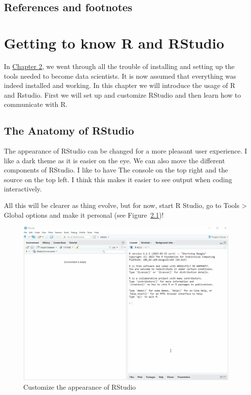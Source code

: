 \documentclass[
  11pt,
  letterpaper,
]{scrbook}
\begin{document}
\hypertarget{references-and-footnotes-1}{%
\section{References and footnotes}\label{references-and-footnotes-1}}


\hypertarget{getting-to-know-r-and-rstudio}{%
\chapter{Getting to know R and
RStudio}\label{getting-to-know-r-and-rstudio}}

In \protect\hyperlink{introduction-to-data-science}{Chapter 2}, we went
through all the trouble of installing and setting up the tools needed to
become data scientists. It is now assumed that everything was indeed
installed and working. In this chapter we will introduce the usage of R
and Rstudio. First we will set up and customize RStudio and then learn
how to communicate with R.

\hypertarget{the-anatomy-of-rstudio}{%
\section{The Anatomy of RStudio}\label{the-anatomy-of-rstudio}}

The appearance of RStudio can be changed for a more pleasant user
experience. I like a dark theme as it is easier on the eye. We can also
move the different components of RStudio. I like to have The console on
the top right and the source on the top left. I think this makes it
easier to see output when coding interactively.

All this will be clearer as thing evolve, but for now, start R Studio,
go to Tools \textgreater{} Global options and make it personal (see
Figure~\ref{fig-customize})!

\begin{figure}

{\centering \includegraphics{images/ch3/03-customizerstudio.gif}

}

\caption{\label{fig-customize}Customize the appearance of RStudio}

\end{figure}
\end{document}
